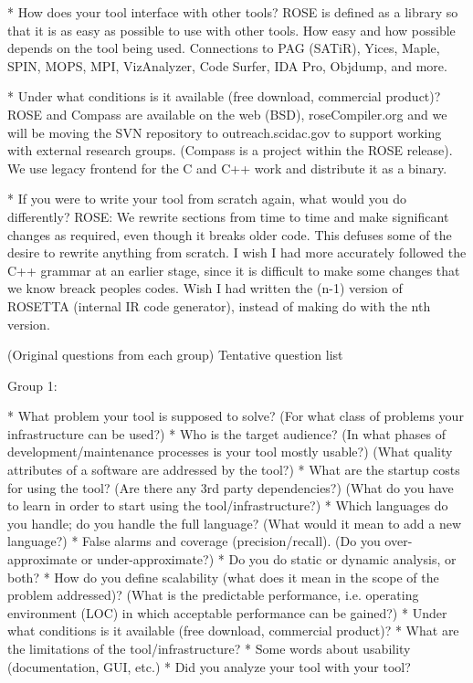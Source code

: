 {    * How does your tool interface with other tools?
      ROSE is defined as a library so that it is as easy as possible to use with other
         tools.  How easy and how possible depends on the tool being used. Connections 
         to PAG (SATiR), Yices, Maple, SPIN, MOPS, MPI, VizAnalyzer, Code Surfer,
         IDA Pro, Objdump, and more.

    * Under what conditions is it available (free download, commercial product)?
      ROSE and Compass are available on the web (BSD), roseCompiler.org and we will
         be moving the SVN repository to outreach.scidac.gov to support working with
         external research groups. (Compass is a project within the ROSE release).
         We use legacy frontend for the C and C++ work and distribute it as a binary.

    * If you were to write your tool from scratch again, what would you do differently?
      ROSE: We rewrite sections from time to time and make significant changes as 
         required, even though it breaks older code.  This defuses some of the desire
         to rewrite anything from scratch.  I wish I had more accurately followed
         the C++ grammar at an earlier stage, since it is difficult to make some 
         changes that we know breack peoples codes.  Wish I had written the (n-1)
         version of ROSETTA (internal IR code generator), instead of making do 
         with the nth version.

(Original questions from each group) Tentative question list

Group 1:

    * What problem your tool is supposed to solve? (For what class of problems your infrastructure can be used?)
    * Who is the target audience? (In what phases of development/maintenance processes is your tool mostly usable?) (What quality attributes of a software are addressed by the tool?)
    * What are the startup costs for using the tool? (Are there any 3rd party dependencies?) (What do you have to learn in order to start using the tool/infrastructure?)
    * Which languages do you handle; do you handle the full language? (What would it mean to add a new language?)
    * False alarms and coverage (precision/recall). (Do you over-approximate or under-approximate?)
    * Do you do static or dynamic analysis, or both?
    * How do you define scalability (what does it mean in the scope of the problem addressed)? (What is the predictable performance, i.e. operating environment (LOC) in which acceptable performance can be gained?)
    * Under what conditions is it available (free download, commercial product)?
    * What are the limitations of the tool/infrastructure?
    * Some words about usability (documentation, GUI, etc.)
    * Did you analyze your tool with your tool? 

}
